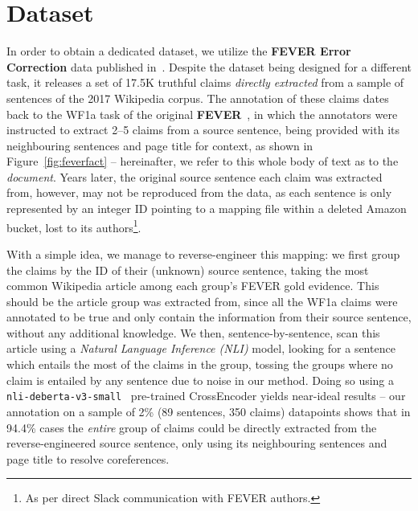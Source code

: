 \begin{comment}
    \section{Data Analysis}\label{sec:data}
In order to perform practical experiments on the task of claim generation, we need to establish sets of gold data for such task.
For this purpose, we collect two sorts of datasets -- a \textit{dedicated} dataset annotated in a controlled \q{lab} environment with annotators being instructed to follow the exact definition of the task, and a couple of \textit{domain-related} datasets featuring the real-world sources of factual claims in their various forms.
\end{comment}

\section{\ds{} Dataset}\label{sec:feverfact}
In order to obtain a dedicated dataset, we utilize the \textbf{FEVER Error Correction} data published in~\cite{thorne-vlachos-2021-evidence}.
Despite the dataset being designed for a different task, it releases a set of 17.5K truthful claims \textit{directly extracted} from a sample of sentences of the 2017 Wikipedia corpus.
The annotation of these claims dates back to the WF1a task of the original \textbf{FEVER}~\cite{thorne-etal-2018-fever}, in which the annotators were instructed to extract 2--5 claims from a source sentence, being provided with its neighbouring sentences and page title for context, as shown in Figure~\ref{fig:feverfact} -- hereinafter, we refer to this whole body of text as to the \textit{\ds{} document}.
Years later, the original source sentence each claim was extracted from, however, may not be reproduced from the data, as each sentence is only represented by an integer ID pointing to a mapping file within a deleted Amazon bucket, lost to its authors\footnote{As per direct Slack communication with FEVER authors.}. 

With a simple idea, we manage to reverse-engineer this mapping:
we first group the claims by the ID of their (unknown) source sentence, taking the most common Wikipedia article among each group's FEVER gold evidence.
This should be the article group was extracted from, since all the WF1a claims were annotated to be true and only contain the information from their source sentence, without any additional knowledge.
We then, sentence-by-sentence, scan this article using a \textit{Natural Language Inference (NLI)} model, looking for a sentence which entails the most of the claims in the group, tossing the groups where no claim is entailed by any sentence due to noise in our method.
Doing so using a \texttt{nli-deberta-v3-small}~\cite{he2021deberta,he2021debertav3,reimers-gurevych-2019-sentence} pre-trained CrossEncoder yields near-ideal results -- our annotation on a sample of 2\% (89 sentences, 350 claims) datapoints shows that in 94.4\% cases the \textit{entire} group of claims could be directly extracted from the reverse-engineered source sentence, only using its neighbouring sentences and page title to resolve coreferences.

